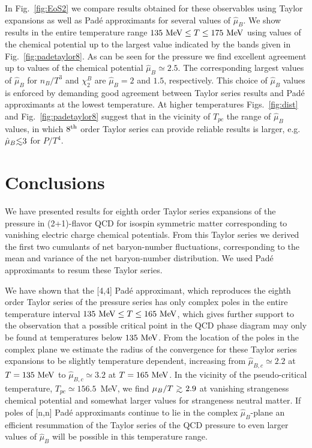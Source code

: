\documentclass[pdflatex,prd,twocolumn,showpacs,superscriptaddress,nofootinbib]{revtex4-1}
\def\lsim{\raise0.3ex\hbox{$<$\kern-0.75em\raise-1.1ex\hbox{$\sim$}}}
\def\gsim{\raise0.3ex\hbox{$>$\kern-0.75em\raise-1.1ex\hbox{$\sim$}}}
\newcommand \hmu {\hat{\mu}}
\begin{document}
In Fig.~\ref{fig:EoS2} we compare results obtained for these observables using Taylor expansions as well as Pad\'e approximants
for several values of $\hmu_B$. We show results in the entire 
temperature range $135~{\rm MeV}\le T \le 175~{\rm MeV}$ using values of the chemical potential up to the 
largest value indicated by the bands given in
Fig.~\ref{fig:padetaylor8}. 
As can be seen for the pressure we find
excellent agreement up to values of the chemical potential $\hmu_B\simeq 2.5$. The corresponding largest
values of $\hmu_B$ for $n_B/T^3$ and $\chi_2^B$ are
$\hmu_B=2$ and $1.5$, respectively. This choice of 
$\hmu_B$ values is enforced by demanding good agreement
between Taylor series results and Pad\'e approximants 
at the lowest temperature. At higher temperatures Figs.~\ref{fig:dist}
and Fig.~\ref{fig:padetaylor8} suggest that 
in the vicinity of $T_{pc}$ the range of $\hmu_B$ values, in which $8^{\rm th}$ order Taylor series can provide reliable results is larger, e.g. $\hmu_B \lsim 3$ for $P/T^4$. 

\section{Conclusions}

We have presented results for eighth order  Taylor series expansions of the pressure in (2+1)-flavor QCD for isospin symmetric matter corresponding to vanishing electric charge chemical potentials. From this Taylor series 
we derived the first two cumulants of net baryon-number fluctuations, corresponding to the mean and  variance 
of the net baryon-number distribution.
We used Pad\'e approximants to resum these Taylor series.

We have shown that the [4,4] Pad\'e
approximant, which reproduces the 
eighth order Taylor series of the 
pressure series has only complex 
poles in the entire temperature 
interval $135~{\rm MeV}\le T\le 165~{\rm MeV}$, which gives further support to
the observation that a possible critical point in the QCD phase diagram may only be found at temperatures below $135~{\rm MeV}$. From the location of the poles in the complex plane we estimate the radius of the 
convergence for these Taylor series expansions to be slightly temperature dependent, increasing from $\hmu_{B,c}\simeq 2.2$ at $T=135~{\rm MeV}$ to $\hmu_{B,c}\simeq 3.2$ at $T=165~{\rm MeV}$. 
In the vicinity of the pseudo-critical temperature, $T_{pc}\simeq 156.5$~MeV, we find $\mu_B/T\ \gsim\ 2.9$ at vanishing strangeness chemical potential and somewhat larger values for strangeness neutral matter. 
If poles of [n,n] Pad\'e
approximants continue to lie in the complex 
$\hmu_B$-plane an efficient resummation of the 
Taylor series of the QCD pressure to even larger values of
$\hmu_B$ will be possible in this temperature range. 
\end{document}
